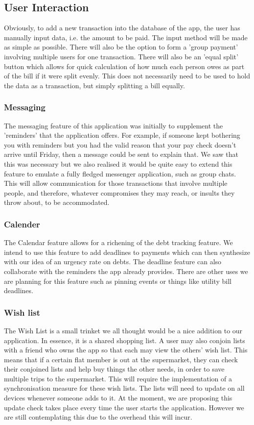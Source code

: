 \documentclass[a4paper,9t]{article}
\begin{document}
\subsection*{User Interaction}
Obviously, to add a new transaction into the database of the app, the user has manually input data, i.e. the amount to be paid. The input method will be made as simple as possible. There will also be the option to form a 'group payment' involving multiple users for one transaction. There will also be an 'equal split' button which allows for quick calculation of how much each person owes as part of the bill if it were split evenly. This does not necessarily need to be used to hold the data as a transaction, but simply splitting a bill equally.

\subsubsection*{Messaging}
The messaging feature of this application was initially to supplement the 'reminders' that the application offers. For example, if someone kept bothering you with reminders but you had the valid reason that your pay check doesn't arrive until Friday, then a message could be sent to explain that.
We saw that this was necessary but we also realised it would be quite easy to extend this feature to emulate a fully fledged messenger application, such as group chats. This will allow communication for those transactions that involve multiple people, and therefore, whatever compromises they may reach, or insults they throw about, to be accommodated.

\subsubsection*{Calender}
The Calendar feature allows for a richening of the debt tracking feature. We intend to use this feature to add deadlines to payments which can then synthesize with our idea of an urgency rate on debts. The deadline feature can also collaborate with the reminders the app already provides.
There are other uses we are planning for this feature such as pinning events or things like utility bill deadlines.

\subsubsection*{Wish list}
The Wish List is a small trinket we all thought would be a nice addition to our application. In essence, it is a shared shopping list. A user may also conjoin lists with a friend who owns the app so that each may view the others' wish list. This means that if a certain flat member is out at the supermarket, they can check their conjoined lists and help buy things the other needs, in order to save multiple trips to the supermarket.
This will require the implementation of a synchronisation measure for these wish lists. The lists will need to update on all devices whenever someone adds to it. At the moment, we are proposing this update check takes place every time the user starts the application. However we are still contemplating this due to the overhead this will incur.
\end{document}
